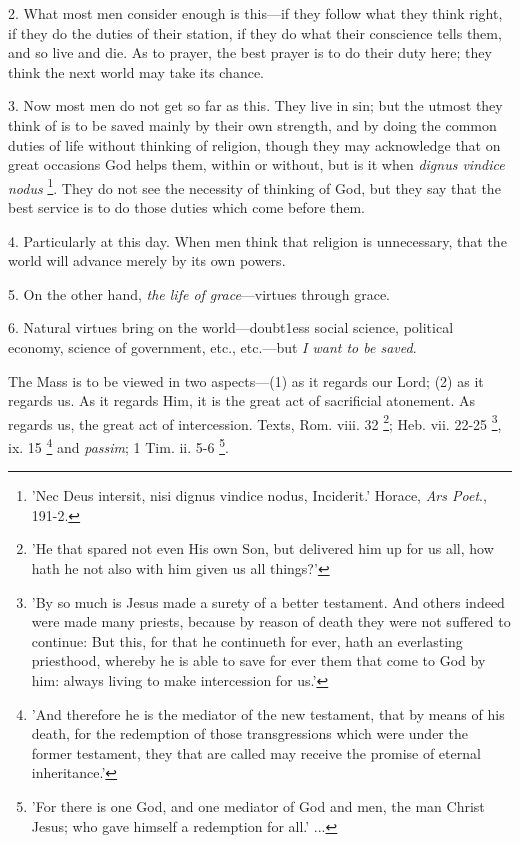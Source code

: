 2. What most men consider enough is this—if
they follow what they think right, if they do the duties of
their station, if they do what their conscience tells them, and so
live and die. As to prayer, the best prayer is to do their duty here;
they think the next world may take its chance.

3. Now most men do not get so far as this. They
live in sin; but the utmost they think of is to be saved mainly by
their own strength, and by doing the common duties of life without
thinking of religion, though they may acknowledge that on great
occasions God helps them, within or without, but is it when \emph{dignus
vindice nodus} \footnote{'Nec Deus intersit, nisi
dignus vindice nodus, Inciderit.' Horace, \emph{Ars Poet}., 191-2.}.
They do not see the necessity of thinking of God, but they say that
the best service is to do those duties which come before them.

4. Particularly at this day. When men think that
religion is unnecessary, that the world will advance merely by its own
powers.

5. On the other hand, \emph{the life of grace}—virtues
through grace.

6. Natural virtues bring on the world—doubt1ess
social science, political economy, science of government, etc.,
etc.—but \emph{I want to be saved}.


The Mass is to be viewed in two aspects—(1) as
it regards our Lord; (2) as it regards us. As it regards Him, it is
the great act of sacrificial atonement. As regards us, the great act
of intercession. Texts, Rom. viii. 32 \footnote{'He that spared not even
His own Son, but delivered him up for us all, how hath he not also
with him given us all things?'}; Heb. vii. 22-25 \footnote{'By so much is Jesus
made a surety of a better testament. And others indeed were made many
priests, because by reason of death they were not suffered to
continue: But this, for that he continueth for ever, hath an
everlasting priesthood, whereby he is able to save for ever them that
come to God by him: always living to make intercession for us.'},
ix. 15 \footnote{'And therefore he is the
mediator of the new testament, that by means of his death, for the
redemption of those transgressions which were under the former
testament, they that are called may receive the promise of eternal
inheritance.'} and \emph{passim};
1 Tim. ii. 5-6 \footnote{'For there is one God,
and one mediator of God and men, the man Christ Jesus; who gave
himself a redemption for all.' ...}.

